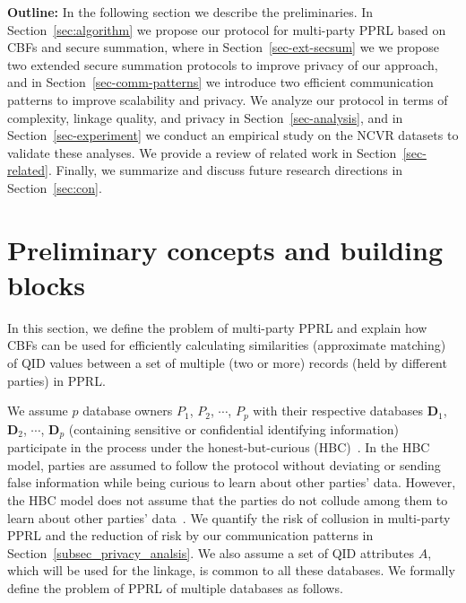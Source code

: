 \documentclass{sig-alternate}
\begin{document}
\smallskip
\textbf{Outline:} 
In the following section 
we describe the preliminaries. 
In Section~\ref{sec:algorithm} we 
propose our protocol
for multi-party PPRL 
based on CBFs and secure summation,  
where in Section~\ref{sec-ext-secsum} we we propose two extended
secure summation protocols to improve privacy of our approach, 
and in 
Section~\ref{sec-comm-patterns} we introduce two efficient
communication patterns to improve scalability and privacy. 
We analyze our protocol 
in terms of complexity, linkage quality, and privacy
in Section~\ref{sec-analysis}, and  
in Section~\ref{sec-experiment} we
conduct an empirical study on the NCVR datasets
to validate these analyses. We provide a review
of related work in Section~\ref{sec-related}.
Finally, we summarize and
discuss future research directions in
Section~\ref{sec:con}.


\section{Preliminary concepts and building blocks}
\label{sec:precon}

In this section, we define 
the problem of multi-party PPRL and explain
how CBFs can be used
for efficiently calculating similarities (approximate matching) of 
QID values 
between a set of multiple (two or more) 
records (held by different parties) in PPRL. 

We assume $p$ database owners $P_1$, $P_2$, $\cdots$, $P_p$
with their respective databases $\mathbf{D}_1$, $\mathbf{D}_2$, $\cdots$, $\mathbf{D}_p$
(containing sensitive or
confidential identifying information)
participate in the process under the honest-but-curious (HBC)~\cite{Vat13}.
In the HBC model, parties are assumed to follow the protocol without
deviating or sending false information while being curious to learn about other
parties' data.
However, the HBC model does not assume that the parties do not collude
among them to learn about other parties' data~\cite{Lin09}.
We quantify the risk of collusion in multi-party PPRL and the reduction
of risk by our communication patterns in Section~\ref{subsec_privacy_analsis}.
We also assume a set of QID attributes $A$, which will
be used for the linkage, is common to all these databases.
We formally define the problem of PPRL of multiple databases as follows.
\end{document}
